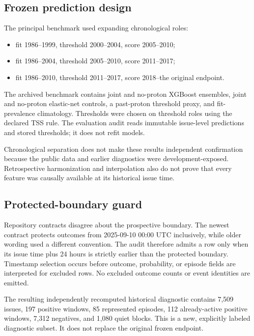 \documentclass[11pt]{article}
\begin{document}
\subsection{Frozen prediction design}

The principal benchmark used expanding chronological roles:

\begin{itemize}
\item fit 1986--1999, threshold 2000--2004, score 2005--2010;
\item fit 1986--2004, threshold 2005--2010, score 2011--2017;
\item fit 1986--2010, threshold 2011--2017, score 2018--the original endpoint.
\end{itemize}

The archived benchmark contains joint and no-proton XGBoost ensembles, joint and no-proton elastic-net controls, a past-proton threshold proxy, and fit-prevalence climatology. Thresholds were chosen on threshold roles using the declared TSS rule. The evaluation audit reads immutable issue-level predictions and stored thresholds; it does not refit models.

Chronological separation does not make these results independent confirmation because the public data and earlier diagnostics were development-exposed. Retrospective harmonization and interpolation also do not prove that every feature was causally available at its historical issue time.

\subsection{Protected-boundary guard}

Repository contracts disagree about the prospective boundary. The newest contract protects outcomes from 2025-09-10 00:00 UTC inclusively, while older wording used a different convention. The audit therefore admits a row only when its issue time plus 24 hours is strictly earlier than the protected boundary. Timestamp selection occurs before outcome, probability, or episode fields are interpreted for excluded rows. No excluded outcome counts or event identities are emitted.

The resulting independently recomputed historical diagnostic contains 7,509 issues, 197 positive windows, 85 represented episodes, 112 already-active positive windows, 7,312 negatives, and 1,080 quiet blocks. This is a new, explicitly labeled diagnostic subset. It does not replace the original frozen endpoint.
\end{document}
